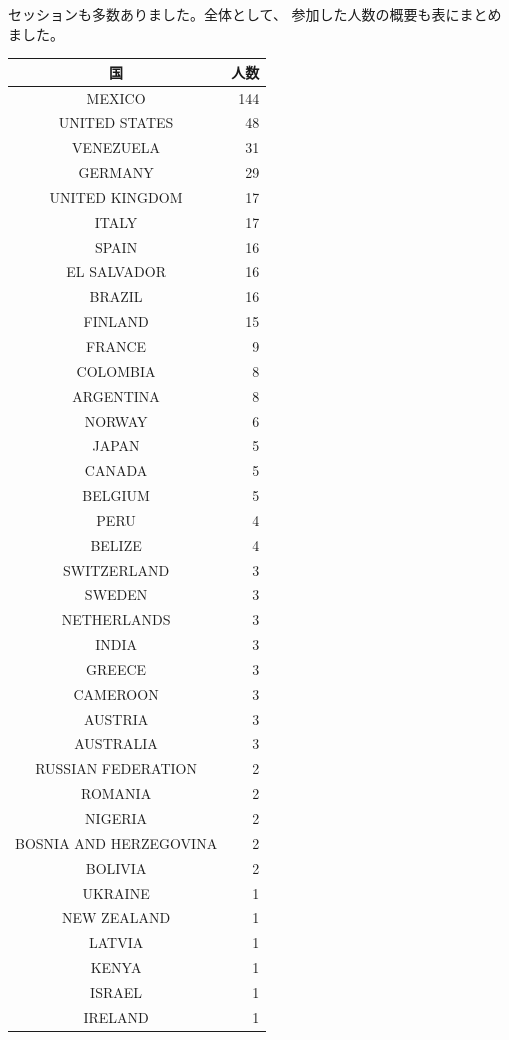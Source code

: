 \documentclass[mingoth,a4paper]{jsarticle}
\begin{document}
セッションも多数ありました。全体として、
参加した人数の概要も表にまとめました。

\begin{minipage}[t]{0.3\hsize}
 {\scriptsize
\begin{center}
 \begin{tabular}[t]{@{\vrule width 1pt}c|r@{\ \vrule width 1pt}}
\hline
国 & 人数 \\
\hline
 MEXICO & 144 \\
 UNITED STATES & 48 \\
 VENEZUELA & 31 \\
 GERMANY & 29 \\
 UNITED KINGDOM & 17 \\
 ITALY & 17 \\
 SPAIN & 16 \\
 EL SALVADOR & 16 \\
 BRAZIL & 16 \\
 FINLAND & 15 \\
 FRANCE & 9 \\
 COLOMBIA & 8 \\
 ARGENTINA & 8 \\
 NORWAY & 6 \\
 JAPAN & 5 \\
 CANADA & 5 \\
 BELGIUM & 5 \\
 PERU & 4 \\
 BELIZE & 4 \\
 SWITZERLAND & 3 \\
 SWEDEN & 3 \\
 NETHERLANDS & 3 \\
 INDIA & 3 \\
 GREECE & 3 \\
 CAMEROON & 3 \\
 AUSTRIA & 3 \\
 AUSTRALIA & 3 \\
 RUSSIAN FEDERATION & 2 \\
 ROMANIA & 2 \\
 NIGERIA & 2 \\
 BOSNIA AND HERZEGOVINA & 2 \\
 BOLIVIA & 2 \\
 UKRAINE & 1 \\
 NEW ZEALAND & 1 \\
 LATVIA & 1 \\
 KENYA & 1 \\
 ISRAEL & 1 \\
 IRELAND & 1 \\

\end{tabular}
\end{center}}
\end{minipage}
\end{document}
